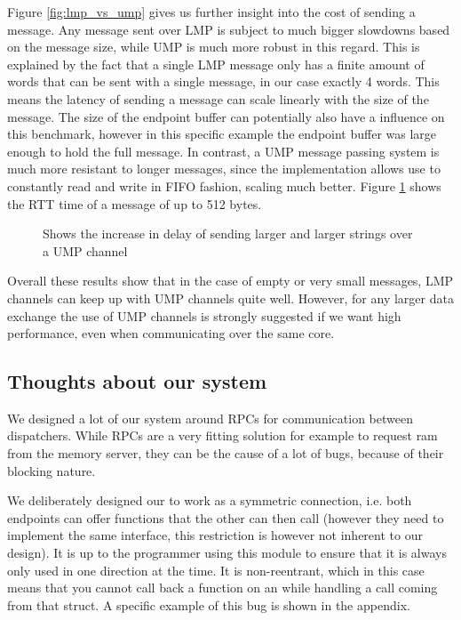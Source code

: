 Figure \ref{fig:lmp_vs_ump} gives us further insight into the cost of sending a message. Any message sent over LMP is subject to much bigger slowdowns based on the message size, while UMP is much more robust in this regard. This is explained by the fact that a single LMP message only has a finite amount of words that can be sent with a single message, in our case exactly 4 words. This means the latency of sending a message can scale linearly with the size of the message. The size of the endpoint buffer can potentially also have a influence on this benchmark, however in this specific example the endpoint buffer was large enough to hold the full message. In contrast, a UMP message passing system is much more resistant to longer messages, since the implementation allows use to constantly read and write in FIFO fashion, scaling much better. Figure \ref{fig:rtt_strings} shows the RTT time of a message of up to 512 bytes.

\begin{figure}[h!]
    \centering
        \resizebox{\textwidth}{!}{
            \hspace{-0.40in}
            
        }
    \caption{Shows the increase in delay of sending larger and larger strings over a UMP channel}
    \label{fig:rtt_strings}
\end{figure}

Overall these results show that in the case of empty or very small messages, LMP channels can keep up with UMP channels quite well. However, for any larger data exchange the use of UMP channels is strongly suggested if we want high performance, even when communicating over the same core.
\newpage
\subsection{Thoughts about our system}
We designed a lot of our system around RPCs for communication between dispatchers.
While RPCs are a very fitting solution for example to request ram from the memory server,
they can be the cause of a lot of bugs, because of their blocking nature.

We deliberately designed our  to work as a symmetric connection, i.e. both
endpoints can offer functions that the other can then call (however they need to implement the same interface, this restriction is however not inherent to our design). It is up to the programmer using this
module to ensure that it is always only used in one direction at the time. It is non-reentrant, which in
this case means that you cannot call back a function on an  while handling a call
coming from that struct. A specific example of this bug is shown in the appendix.


